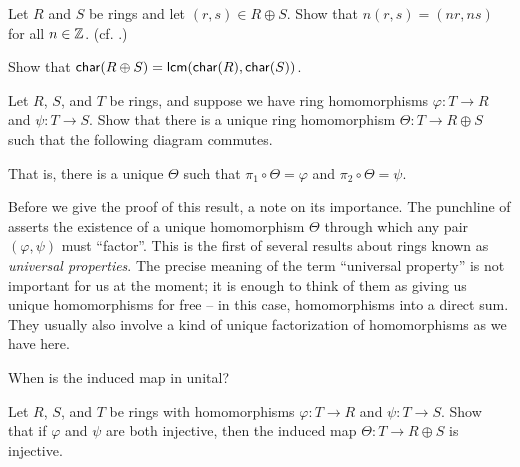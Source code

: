 \begin{exercise}
Let \(R\) and \(S\) be rings and let \((r,s) \in R \oplus S\).
Show that \(n(r,s) = (nr, ns)\) for all \(n \in \mathbb{Z}\).
(cf. .)
\end{exercise}


\begin{exercise}
Show that \(\mathsf{char}(R \oplus S) = \mathsf{lcm}(\mathsf{char}(R), \mathsf{char}(S))\).
\end{exercise}


\begin{exercise}\label{exerc:up-direct-sum}
Let \(R\), \(S\), and \(T\) be rings, and suppose we have ring homomorphisms \(\varphi : T \rightarrow R\) and \(\psi : T \rightarrow S\).
Show that there is a unique ring homomorphism \(\Theta : T \rightarrow R \oplus S\) such that the following diagram commutes.
\begin{center}
\end{center}
That is, there is a unique \(\Theta\) such that \(\pi_1 \circ \Theta = \varphi\) and \(\pi_2 \circ \Theta = \psi\).
\end{exercise}


Before we give the proof of this result, a note on its importance.
The punchline of  asserts the existence of a unique homomorphism \(\Theta\) through which any pair \((\varphi, \psi)\) must ``factor''.
This is the first of several results about rings known as \emph{universal properties}.
The precise meaning of the term ``universal property'' is not important for us at the moment; it is enough to think of them as giving us unique homomorphisms for free -- in this case, homomorphisms into a direct sum.
They usually also involve a kind of unique factorization of homomorphisms as we have here.


\begin{exercise}
When is the induced map in  unital?
\end{exercise}


\begin{exercise}
Let \(R\), \(S\), and \(T\) be rings with homomorphisms \(\varphi : T \rightarrow R\) and \(\psi : T \rightarrow S\).
Show that if \(\varphi\) and \(\psi\) are both injective, then the induced map \(\Theta : T \rightarrow R \oplus S\) is injective.
\end{exercise}


